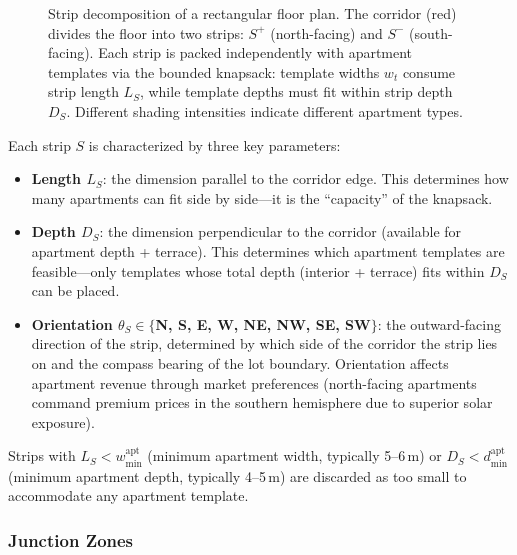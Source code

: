 \documentclass[11pt,a4paper]{article}
\begin{document}
\begin{figure}[ht]
\caption{Strip decomposition of a rectangular floor plan. The corridor
(red) divides the floor into two strips: $S^+$ (north-facing) and $S^-$
(south-facing). Each strip is packed independently with apartment
templates via the bounded knapsack: template widths $w_t$ consume strip
length $L_S$, while template depths must fit within strip depth $D_S$.
Different shading intensities indicate different apartment types.}
\label{fig:strip-packing}
\end{figure}

Each strip $S$ is characterized by three key parameters:
\begin{itemize}[nosep]
    \item \textbf{Length $L_S$}: the dimension parallel to the corridor
    edge. This determines how many apartments can fit side by side---it
    is the ``capacity'' of the knapsack.
    \item \textbf{Depth $D_S$}: the dimension perpendicular to the
    corridor (available for apartment depth + terrace). This determines
    which apartment templates are feasible---only templates whose total
    depth (interior + terrace) fits within $D_S$ can be placed.
    \item \textbf{Orientation $\theta_S \in \{$N, S, E, W, NE, NW, SE,
    SW$\}$}: the outward-facing direction of the strip, determined by
    which side of the corridor the strip lies on and the compass
    bearing of the lot boundary. Orientation affects apartment revenue
    through market preferences (north-facing apartments command premium
    prices in the southern hemisphere due to superior solar exposure).
\end{itemize}

Strips with $L_S < w_{\min}^{\text{apt}}$ (minimum apartment width,
typically 5--6\,m) or $D_S < d_{\min}^{\text{apt}}$ (minimum apartment
depth, typically 4--5\,m) are discarded as too small to accommodate any
apartment template.

\subsubsection{Junction Zones}
\end{document}
